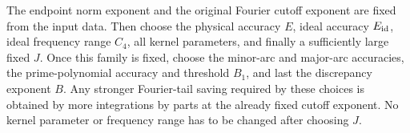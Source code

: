 \begin{remark}\label{sh:choice-order}
The endpoint norm exponent and the original Fourier cutoff exponent
are fixed from the input data.  Then choose the physical accuracy
$E$, ideal accuracy $E_{\rm id}$, ideal frequency range $C_4$, all
kernel parameters, and finally a sufficiently large fixed $J$.
Once this family is fixed, choose the minor-arc and major-arc
accuracies, the prime-polynomial accuracy and threshold $B_1$, and
last the discrepancy exponent $B$.  Any stronger Fourier-tail
saving required by these choices is obtained by more integrations
by parts at the already fixed cutoff exponent.  No kernel parameter
or frequency range has to be changed after choosing $J$.
\end{remark}
